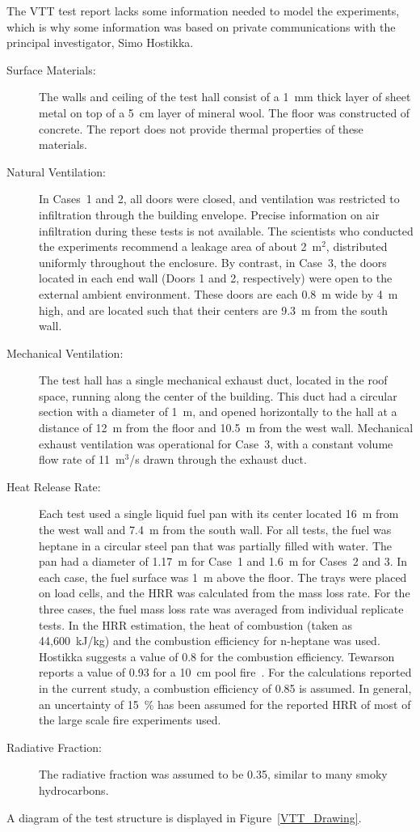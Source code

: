 The VTT test report lacks some information needed to model the experiments, which is why some information was based on private communications with the
principal investigator, Simo Hostikka.
\begin{description}
\item[Surface Materials:] The walls and ceiling of the test hall consist of a 1~mm thick layer of sheet metal on top of a 5~cm layer of mineral wool. The floor was constructed of concrete. The report does not provide thermal properties of these materials.
\item[Natural Ventilation:] In Cases~1 and 2, all doors were closed, and ventilation was restricted to infiltration through the building envelope. Precise information on air infiltration during these tests is not available. The scientists who conducted the experiments recommend a leakage area of about 2~m$^2$, distributed uniformly throughout the enclosure. By contrast, in Case~3, the doors located in each end wall (Doors 1 and 2, respectively) were open to the external ambient environment. These doors are each 0.8~m wide by 4~m high, and are located such that their centers are 9.3~m from the south wall.
\item[Mechanical Ventilation:] The test hall has a single mechanical exhaust duct, located in the roof space, running along the center of the building. This duct had a circular section with a diameter of 1~m, and opened horizontally to the hall at a distance of 12~m from the floor and 10.5~m from the west wall. Mechanical exhaust ventilation was operational for Case~3, with a constant volume flow rate of 11~m$^3$/s drawn through the exhaust duct.
\item[Heat Release Rate:] Each test used a single liquid fuel pan with its center located 16~m from the west wall and 7.4~m from the south wall. For all tests, the fuel was heptane in a circular steel pan that was partially filled with water. The pan had a diameter of 1.17~m for Case~1 and 1.6~m for Cases~2 and 3. In each case, the fuel surface was 1~m above the floor. The trays were placed on load cells, and the HRR was calculated from the mass loss rate. For the three cases, the fuel mass loss rate was averaged from individual replicate tests. In the HRR estimation, the heat of combustion (taken as 44,600~kJ/kg) and the combustion efficiency for n-heptane was used. Hostikka suggests a value of 0.8 for the combustion efficiency. Tewarson reports a value of 0.93 for a 10~cm pool fire~\cite{SFPE:Tewarson}. For the calculations reported in the current study, a combustion efficiency of 0.85 is assumed. In general, an uncertainty of 15~\% has been assumed for the reported HRR of most of the large scale fire experiments used.
\item[Radiative Fraction:] The radiative fraction was assumed to be 0.35, similar to many smoky hydrocarbons.
\end{description}
A diagram of the test structure is displayed in Figure~\ref{VTT_Drawing}.

